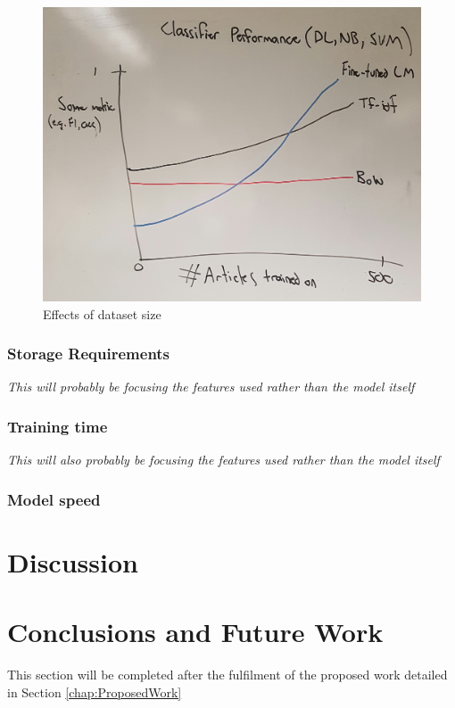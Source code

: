 \documentclass[a4paper,twoside,phd]{BYUPhys}
\begin{document}
\begin{figure}[H]
	\centering
	\includegraphics[totalheight=6cm]{images/classifier-performance-figure-draft.jpg}
	\caption{Effects of dataset size }
	\label{fig:AccruracyFig}
\end{figure}

\subsection{Storage Requirements}

\textit{This will probably be focusing the features used rather than the model itself}

\subsection{Training time}

\textit{This will also probably be focusing the features used rather than the model itself}

\subsection{Model speed}


\chapter{Discussion}
\label{chap:Discussion}

\chapter{Conclusions and Future Work}
\label{chap:Conclusions}
This section will be completed after the fulfilment of the proposed work detailed in Section \ref{chap:ProposedWork}
\end{document}

